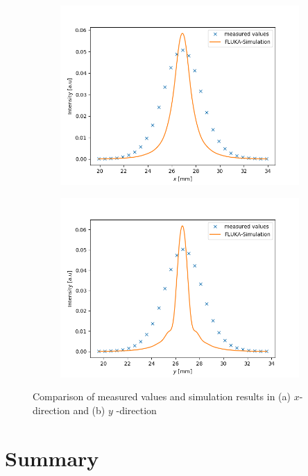 \documentclass[a4paper,parskip]{scrartcl}
\begin{document}
 \begin{figure}
 \centering
 \begin{subfigure}{0.7\linewidth}
 \includegraphics[width =\linewidth]{xScanZ0.png}
 \caption{}
 \end{subfigure}
  \begin{subfigure}{0.7 \linewidth}
 \includegraphics[width =\linewidth]{yScanZ0.png}
 \caption{}
 \end{subfigure}
 \caption{Comparison of measured values and simulation results in (a) $x$- direction and (b) $y$ -direction}
 \label{plane-fits}
 \end{figure}

\section{Summary}
\end{document}
